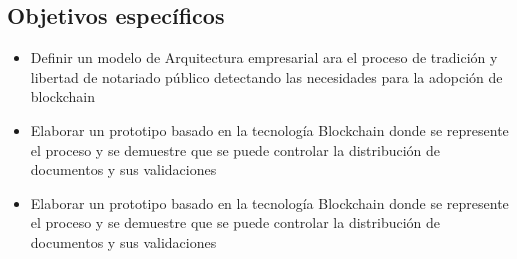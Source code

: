 \subsection{Objetivos específicos}
\begin{itemize}

\item Definir un modelo de Arquitectura empresarial ara el proceso de tradición y libertad de notariado público detectando las necesidades para la adopción de blockchain

\item Elaborar un prototipo basado en la tecnología Blockchain donde se represente el proceso y se demuestre que se puede controlar la distribución de documentos y sus validaciones

\item Elaborar un prototipo basado en la tecnología Blockchain donde se represente el proceso y se demuestre que se puede controlar la distribución de documentos y sus validaciones
\end{itemize}




